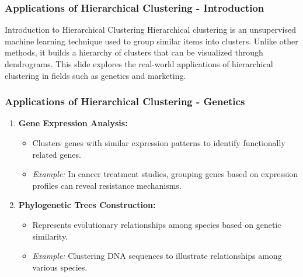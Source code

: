 \documentclass[aspectratio=169]{beamer}
\begin{document}
\begin{frame}[fragile]
    \frametitle{Applications of Hierarchical Clustering - Introduction}
    \begin{block}{Introduction to Hierarchical Clustering}
        Hierarchical clustering is an unsupervised machine learning technique used to group similar items into clusters. Unlike other methods, it builds a hierarchy of clusters that can be visualized through dendrograms. This slide explores the real-world applications of hierarchical clustering in fields such as genetics and marketing.
    \end{block}
\end{frame}

\begin{frame}[fragile]
    \frametitle{Applications of Hierarchical Clustering - Genetics}
    \begin{enumerate}
        \item \textbf{Gene Expression Analysis:}
        \begin{itemize}
            \item Clusters genes with similar expression patterns to identify functionally related genes.
            \item \textit{Example:} In cancer treatment studies, grouping genes based on expression profiles can reveal resistance mechanisms.
        \end{itemize}

        \item \textbf{Phylogenetic Trees Construction:}
        \begin{itemize}
            \item Represents evolutionary relationships among species based on genetic similarity.
            \item \textit{Example:} Clustering DNA sequences to illustrate relationships among various species.
        \end{itemize}
    \end{enumerate}
\end{frame}
\end{document}

